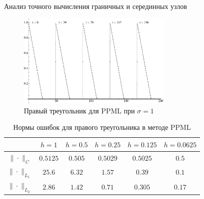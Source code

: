 \documentclass[unicode, 8pt]{beamer}
\begin{document}
    \begin{frame}{Анализ точного вычисления граничных и серединных узлов}
        \begin{figure}[h]
            \centering
            \includegraphics[width=0.66\textwidth]{sigma=1./advectionPPML_rightTriangle.pdf}
            \caption{Правый треугольник для PPML при $ \sigma = 1 $}
            \label{fig:ppml_rightTriangle_1}
        \end{figure}
        \begin{table}[h]
            \centering
            \begin{tabular}{ |c|c|c|c|c|c| } 
             \hline
            & $ h=1 $ &  $ h=0.5$ &  $ h=0.25 $ &  $ h=0.125 $ &  $ h=0.0625 $ \\ 
             \hline 
             $\| \cdot \|_{C}$ & $0.5125$ & $0.505$ & $0.5029$ & $0.5025$ & $0.5$
             \\
             \hline
             $\| \cdot \|_{L_1}$ & $25.6$ & $6.32$ & $1.57$ & $0.39$ & $0.1$
             \\
             \hline
             $\| \cdot \|_{L_2}$ & $2.86$ & $1.42$ & $0.71$ & $0.305$ & $0.17$
             \\
             \hline
            \end{tabular}
            \\[0.1em]
            \caption{Нормы ошибок для правого треугольника в методе PPML}
            \label{table:ltPPML}
        \end{table}
    \end{frame}
\end{document}
